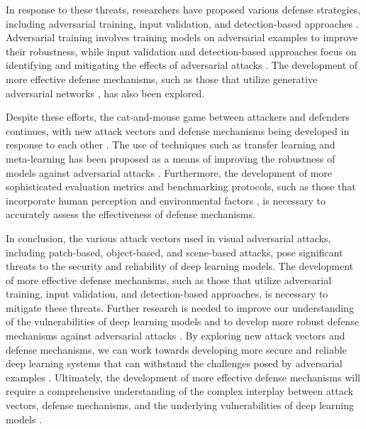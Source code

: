\documentclass[11pt,a4paper]{article}
\begin{document}
In response to these threats, researchers have proposed various defense strategies, including adversarial training, input validation, and detection-based approaches \cite{arxiv:1712.07107}. Adversarial training involves training models on adversarial examples to improve their robustness, while input validation and detection-based approaches focus on identifying and mitigating the effects of adversarial attacks \cite{doi:10.1080/00031305.2021.2006781}. The development of more effective defense mechanisms, such as those that utilize generative adversarial networks \cite{doi:10.1109/access.2022.3160283}, has also been explored.

Despite these efforts, the cat-and-mouse game between attackers and defenders continues, with new attack vectors and defense mechanisms being developed in response to each other \cite{doi:10.1007/s11633-019-1211-x}. The use of techniques such as transfer learning and meta-learning has been proposed as a means of improving the robustness of models against adversarial attacks \cite{doi:10.1109/tip.2021.3092822}. Furthermore, the development of more sophisticated evaluation metrics and benchmarking protocols, such as those that incorporate human perception and environmental factors \cite{doi:10.1007/978-3-030-58589-1_3}, is necessary to accurately assess the effectiveness of defense mechanisms.

In conclusion, the various attack vectors used in visual adversarial attacks, including patch-based, object-based, and scene-based attacks, pose significant threats to the security and reliability of deep learning models. The development of more effective defense mechanisms, such as those that utilize adversarial training, input validation, and detection-based approaches, is necessary to mitigate these threats. Further research is needed to improve our understanding of the vulnerabilities of deep learning models and to develop more robust defense mechanisms against adversarial attacks \cite{doi:10.1109/biosig52210.2021.9548291}. By exploring new attack vectors and defense mechanisms, we can work towards developing more secure and reliable deep learning systems that can withstand the challenges posed by adversarial examples \cite{doi:10.1109/vr51125.2022.00073}. Ultimately, the development of more effective defense mechanisms will require a comprehensive understanding of the complex interplay between attack vectors, defense mechanisms, and the underlying vulnerabilities of deep learning models \cite{doi:10.1007/s13042-021-01435-0}.
\end{document}

